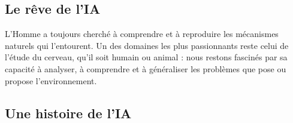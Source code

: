 \subsection{Le rêve de l'IA}
L’Homme a toujours cherché à comprendre et à reproduire les mécanismes naturels qui l'entourent. Un des domaines les plus passionnants reste celui de l'étude du cerveau, qu'il soit humain ou animal : nous restons fascinés par sa capacité à analyser, à comprendre et à généraliser les problèmes que pose ou \og propose \fg{} l'environnement.
\subsection{Une histoire de l'IA}